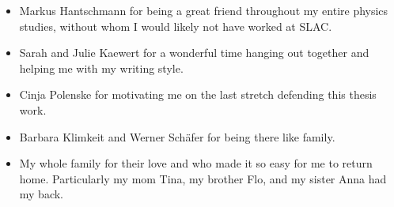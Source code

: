 \begin{itemize}
%
\item Markus Hantschmann for being a great friend throughout my entire physics studies, without whom I would likely not have worked at SLAC.
%
\item Sarah and Julie Kaewert for a wonderful time hanging out together and helping me with my writing style.
%
\item Cinja Polenske for motivating me on the last stretch defending this thesis work.
%
\item Barbara Klimkeit and Werner Schäfer for being there like family.
%
\item My whole family for their love and who made it so easy for me to return home. Particularly my mom Tina, my brother Flo, and my sister Anna had my back.
%
\end{itemize}